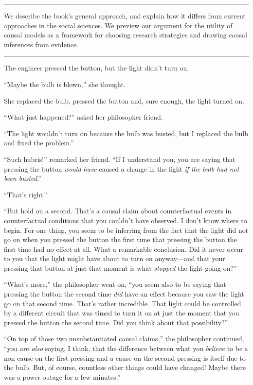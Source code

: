 \documentclass[
  12pt,
]{book}
\begin{document}
\begin{center}\rule{0.5\linewidth}{0.5pt}\end{center}

We describe the book's general approach, and explain how it differs from current approaches in the social sciences. We preview our argument for the utility of causal models as a framework for choosing research strategies and drawing causal inferences from evidence.

\begin{center}\rule{0.5\linewidth}{0.5pt}\end{center}

The engineer pressed the button, but the light didn't turn on.

``Maybe the bulb is blown,'' she thought.

She replaced the bulb, pressed the button and, sure enough, the light turned on.

``What just happened?'' asked her philosopher friend.

``The light wouldn't turn on because the bulb was busted, but I replaced the bulb and fixed the problem.''

``Such hubris!'' remarked her friend. ``If I understand you, you are saying that pressing the button \emph{would have} caused a change in the light \emph{if the bulb had not been busted}.''

``That's right.''

``But hold on a second. That's a causal claim about counterfactual events in counterfactual conditions that you couldn't have observed. I don't know where to begin. For one thing, you seem to be inferring from the fact that the light did not go on when you pressed the button the first time that pressing the button the first time had no effect at all. What a remarkable conclusion. Did it never occur to you that the light might have about to turn on anyway---and that your pressing that button at just that moment is what \emph{stopped} the light going on?''

``What's more,'' the philosopher went on, ``you seem also to be saying that pressing the button the second time \emph{did} have an effect because you saw the light go on that second time. That's rather incredible. That light could be controlled by a different circuit that was timed to turn it on at just the moment that you pressed the button the second time. Did you think about that possibility?''

``On top of those two unsubstantiated causal claims,'' the philosopher continued, ``you are \emph{also} saying, I think, that the difference between what you \emph{believe} to be a non-cause on the first pressing and a cause on the second pressing is itself due to the bulb. But, of course, countless other things could have changed! Maybe there was a power outage for a few minutes.''
\end{document}
